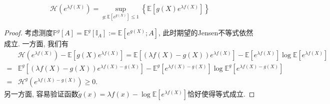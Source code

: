 \begin{theorem}[熵的变分表示]\label{thm:VariationalRepresentationForEntropy}
	\begin{equation}\label{eq:VariationalRepresentationForEntropy}
		\mathcal{H}(e^{\lambda f(X)})
		= \sup_{g \colon \mathbb{E}[e^{g(X)}] \leq 1} \left\{ \mathbb{E} \left[g(X) e^{\lambda f(X)} \right] \right\}
	\end{equation}
\end{theorem}
\begin{proof}
	考虑测度$\mathbb{P}^g[A] = \mathbb{E}^g [\mathbb{I}_A] := \mathbb{E}[e^{g(X)}; A]$, 此时期望的Jensen不等式依然成立. 
	一方面, 我们有
	\begin{align*}
		&\mathcal{H}(e^{\lambda f(X)}) - \mathbb{E}[g(X) e^{\lambda f(X)}]
		= \mathbb{E}\left[ (\lambda f(X) - g(X)) e^{\lambda f(X)} \right] - \mathbb{E}[ e^{\lambda f(X)}] \log \mathbb{E}[ e^{\lambda f(X)}] \\
		=& \mathbb{E}^g  \left[ (\lambda f(X) - g(X)) e^{\lambda f(X) - g(X)} \right] - \mathbb{E}^g[ e^{\lambda f(X) - g(X)}] \log \mathbb{E}^g[ e^{\lambda f(X) - g(X)}] \\
		=& \mathcal{H}^g(e^{\lambda f(X) - g(X)}) \geq 0. 
	\end{align*}
	另一方面, 容易验证函数$\tilde g(x) = \lambda f(x) - \log \mathbb{E}[e^{\lambda f(X)}]$恰好使得等式成立. 
\end{proof}

